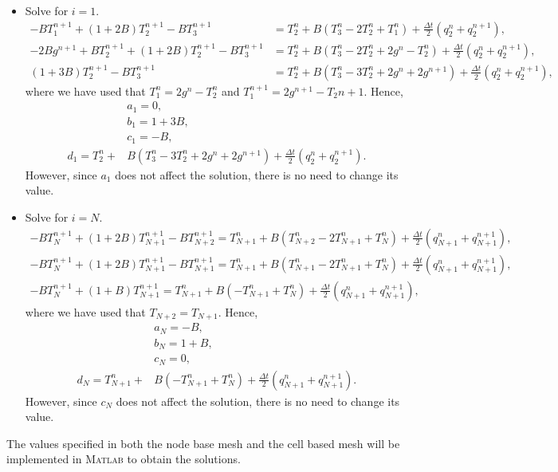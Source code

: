 \begin{itemize}
\item Solve for $i=1$.
\begin{align*}
-BT_{1}^{n+1}+(1+2B)T_2^{n+1}-BT_{3}^{n+1}&=T_2^n+B\left(T_{3}^n-2T_{2}^n+T_{1}^n\right)+\frac{\Delta t}{2}\left(q_2^n+q_2^{n+1}\right),\\
-2Bg^{n+1}+BT_2^{n+1}+(1+2B)T_2^{n+1}-BT_{3}^{n+1}&=T_2^n+B\left(T_{3}^n-2T_{2}^n+2g^n-T_2^n\right)+\frac{\Delta t}{2}\left(q_2^n+q_2^{n+1}\right),\\
(1+3B)T_2^{n+1}-BT_{3}^{n+1}&=T_2^n+B\left(T_{3}^n-3T_{2}^n+2g^n+2g^{n+1}\right)+\frac{\Delta t}{2}\left(q_2^n+q_2^{n+1}\right),
\end{align*}
where we have used that $T_1^n=2g^n-T_2^n$ and $T_1^{n+1}=2g^{n+1}-T_2{n+1}$. Hence,
\begin{align*}
&a_1=0,\\
&b_1=1+3B,\\
&c_1=-B,\\
d_1=T_2^n+&B\left(T_{3}^n-3T_{2}^n+2g^n+2g^{n+1}\right)+\frac{\Delta t}{2}\left(q_2^n+q_2^{n+1}\right).
\end{align*}
However, since $a_1$ does not affect the solution, there is no need to change its value.
\item Solve for $i=N$.
\begin{align*}
-BT_{N}^{n+1}+(1+2B)T_{N+1}^{n+1}-BT_{N+2}^{n+1}=T_{N+1}^n+B\left(T_{N+2}^n-2T_{N+1}^n+T_{N}^n\right)+\frac{\Delta t}{2}\left(q_{N+1}^n+q_{N+1}^{n+1}\right),\\
-BT_{N}^{n+1}+(1+2B)T_{N+1}^{n+1}-BT_{N+1}^{n+1}=T_{N+1}^n+B\left(T_{N+1}^n-2T_{N+1}^n+T_{N}^n\right)+\frac{\Delta t}{2}\left(q_{N+1}^n+q_{N+1}^{n+1}\right),\\
-BT_{N}^{n+1}+(1+B)T_{N+1}^{n+1}=T_{N+1}^n+B\left(-T_{N+1}^n+T_{N}^n\right)+\frac{\Delta t}{2}\left(q_{N+1}^n+q_{N+1}^{n+1}\right),
\end{align*}
where we have used that $T_{N+2}=T_{N+1}$. Hence,
\begin{align*}
&a_{N}=-B,\\
&b_{N}=1+B,\\
&c_{N}=0,\\
d_{N}=T_{N+1}^n+&B\left(-T_{N+1}^n+T_{N}^n\right)+\frac{\Delta t}{2}\left(q_{N+1}^n+q_{N+1}^{n+1}\right).
\end{align*}
However, since $c_{N}$ does not affect the solution, there is no need to change its value.
\end{itemize}
The values specified in both the node base mesh and the cell based mesh will be implemented in \textsc{Matlab} to obtain the solutions.